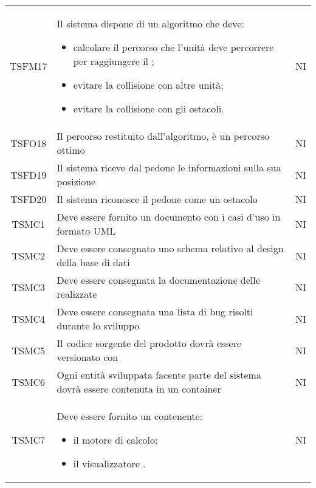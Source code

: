 \begin{longtable}[h!] { c  m{12cm} c}
		TSFM17  & Il sistema dispone di un algoritmo che deve:
				\begin{itemize}
					\item calcolare il percorso che l'unità deve percorrere per raggiungere il \glock{POI};
					\item evitare la collisione con altre unità;
					\item evitare la collisione con gli ostacoli.
				\end{itemize}		
										& NI \\
		
		TSFO18  & Il percorso restituito dall'algoritmo, è un percorso ottimo & NI\\
		
		TSFD19 & Il sistema riceve dal pedone le informazioni sulla sua posizione & NI\\

		TSFD20  & Il sistema riconosce il pedone come un ostacolo & NI \\
		\hline
		
		TSMC1   & Deve essere fornito un documento con i casi d'uso in formato UML & NI \\
		
		TSMC2   & Deve essere consegnato uno schema relativo al design della base di dati & NI \\
		
		TSMC3  &Deve essere consegnata la documentazione delle \glock{APIG} realizzate & NI\\
		
		TSMC4   & Deve essere consegnata una lista di bug risolti durante lo sviluppo & NI\\
		
		TSMC5   & Il codice sorgente del prodotto dovrà essere versionato con \glock{GitHub} & NI\\
		
		TSMC6   & Ogni entità sviluppata facente parte del sistema dovrà essere contenuta in un container \glock{Docker} & NI \\
		
		TSMC7   & Deve essere fornito un \glock{Dockerfile} contenente:
						\begin{itemize}
							\item il motore di calcolo;
							\item il visualizzatore \glock{Real-Time}.
						\end{itemize} 
											& NI \\
											

\end{longtable}
